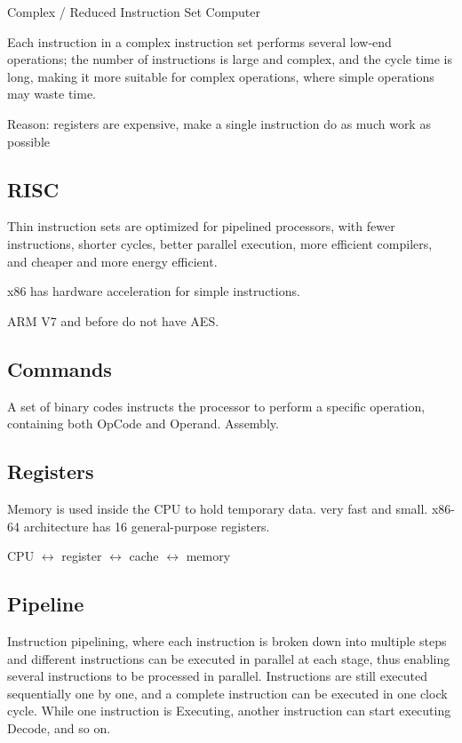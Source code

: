 \documentclass[11pt,journal,compsoc]{IEEEtran}
\begin{document}
Complex / Reduced Instruction Set Computer

Each instruction in a complex instruction set performs several low-end operations; the number of instructions is large and complex, and the cycle time is long, making it more suitable for complex operations, where simple operations may waste time.

Reason: registers are expensive, make a single instruction do as much work as possible


\subsection{RISC}

Thin instruction sets are optimized for pipelined processors, with fewer instructions, shorter cycles, better parallel execution, more efficient compilers, and cheaper and more energy efficient.

x86 has hardware acceleration for simple instructions.

ARM V7 and before do not have AES.


\subsection{Commands}

A set of binary codes instructs the processor to perform a specific operation, containing both OpCode and Operand. Assembly.


\subsection{Registers}

Memory is used inside the CPU to hold temporary data. very fast and small. x86-64 architecture has 16 general-purpose registers.

CPU $\leftrightarrow$ register $\leftrightarrow$ cache $\leftrightarrow$ memory


\subsection{Pipeline}

Instruction pipelining, where each instruction is broken down into multiple steps and different instructions can be executed in parallel at each stage, thus enabling several instructions to be processed in parallel. Instructions are still executed sequentially one by one, and a complete instruction can be executed in one clock cycle. While one instruction is Executing, another instruction can start executing Decode, and so on.
\end{document}
